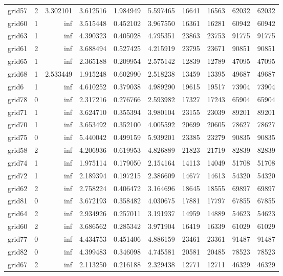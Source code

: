 \begin{longtable}{|l|r|r|r|r|r|r|r|r|r|}
grid57 & 2 & 3.302101 & 3.612516 & 1.984949 & 5.597465 & 16641 & 16563 & 62032 & 62032 \\
grid60 & 1 & inf & 3.515448 & 0.452102 & 3.967550 & 16361 & 16281 & 60942 & 60942 \\
grid63 & 1 & inf & 4.390323 & 0.405028 & 4.795351 & 23863 & 23753 & 91775 & 91775 \\
grid61 & 2 & inf & 3.688494 & 0.527425 & 4.215919 & 23795 & 23671 & 90851 & 90851 \\
grid65 & 1 & inf & 2.365188 & 0.209954 & 2.575142 & 12839 & 12789 & 47095 & 47095 \\
grid68 & 1 & 2.533449 & 1.915248 & 0.602990 & 2.518238 & 13459 & 13395 & 49687 & 49687 \\
grid6 & 1 & inf & 4.610252 & 0.379038 & 4.989290 & 19615 & 19517 & 73904 & 73904 \\
grid78 & 0 & inf & 2.317216 & 0.276766 & 2.593982 & 17327 & 17243 & 65904 & 65904 \\
grid71 & 1 & inf & 3.624710 & 0.355394 & 3.980104 & 23155 & 23039 & 89201 & 89201 \\
grid70 & 1 & inf & 3.653492 & 0.352100 & 4.005592 & 20699 & 20605 & 78627 & 78627 \\
grid75 & 0 & inf & 5.440042 & 0.499159 & 5.939201 & 23385 & 23279 & 90835 & 90835 \\
grid58 & 2 & inf & 4.206936 & 0.619953 & 4.826889 & 21823 & 21719 & 82839 & 82839 \\
grid74 & 1 & inf & 1.975114 & 0.179050 & 2.154164 & 14113 & 14049 & 51708 & 51708 \\
grid72 & 1 & inf & 2.189394 & 0.197215 & 2.386609 & 14677 & 14613 & 54320 & 54320 \\
grid62 & 2 & inf & 2.758224 & 0.406472 & 3.164696 & 18645 & 18555 & 69897 & 69897 \\
grid81 & 0 & inf & 3.672193 & 0.358482 & 4.030675 & 17881 & 17797 & 67855 & 67855 \\
grid64 & 2 & inf & 2.934926 & 0.257011 & 3.191937 & 14959 & 14889 & 54623 & 54623 \\
grid60 & 2 & inf & 3.686562 & 0.285342 & 3.971904 & 16419 & 16339 & 61029 & 61029 \\
grid77 & 0 & inf & 4.434753 & 0.451406 & 4.886159 & 23461 & 23361 & 91487 & 91487 \\
grid82 & 0 & inf & 4.399483 & 0.346098 & 4.745581 & 20581 & 20485 & 78523 & 78523 \\
grid67 & 2 & inf & 2.113250 & 0.216188 & 2.329438 & 12771 & 12711 & 46329 & 46329 \\

\end{longtable}
